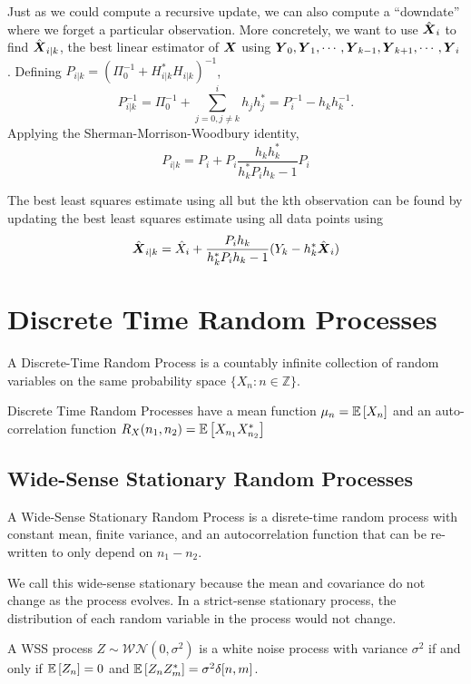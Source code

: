 Just as we could compute a recursive update, we can also compute a ``downdate'' where we forget a particular observation.
More concretely, we want to use $\hat{\boldsymbol{X}}_i$ to find $\hat{\boldsymbol{X}}_{i|k}$, the best linear estimator of $\boldsymbol{X}$ using $\boldsymbol{Y}_0,\boldsymbol{Y}_1,\cdots,\boldsymbol{Y}_{k-1},\boldsymbol{Y}_{k+1},\cdots,\boldsymbol{Y}_i$.
Defining $P_{i|k} = (\Pi_0^{-1} + H_{i|k}^*H_{i|k})^{-1}$,
\[
	P_{i|k}^{-1} = \Pi_0^{-1} + \sum_{j=0,j\neq k}^i h_jh_j^* = P_i^{-1} - h_kh_k^{-1}.
\]
Applying the Sherman-Morrison-Woodbury identity,
\[
	P_{i|k} = P_i + P_i \frac{h_kh_k^*}{h_k^*P_ih_k - 1}P_i
\]
\begin{theorem}
	The best least squares estimate using all but the kth observation can be found by updating the best least squares estimate using all data points using
	\[
		\hat{\boldsymbol{X}}_{i|k} = \hat{X}_i + \frac{P_ih_k}{h_k^*P_ih_k - 1}(Y_k - h_k^*\hat{\boldsymbol{X}}_i)
	\]
	\label{thm:rls:downdate}
\end{theorem}
\section{Discrete Time Random Processes}
\begin{definition}
	A Discrete-Time Random Process is a countably infinite collection of random variables on the same probability space $\{X_n: n\in\mathbb{Z}\}$.
	\label{defn:discrete-time-rp}
\end{definition}
Discrete Time Random Processes have a mean function $\mu_n = \mathbb{E}\left[X_n\right]$ and an auto-correlation function $R_X(n_1, n_2) = \mathbb{E}\left[X_{n_1}X_{n_2}^*\right]$
\subsection{Wide-Sense Stationary Random Processes}
\begin{definition}
	A Wide-Sense Stationary Random Process is a disrete-time random process with constant mean, finite variance, and an autocorrelation function that can be re-written to only depend on $n_1-n_2$.
	\label{defn:wss-process}
\end{definition}
We call this wide-sense stationary because the mean and covariance do not change as the process evolves.
In a strict-sense stationary process, the distribution of each random variable in the process would not change.
\begin{definition}
	A WSS process $Z\sim \mathcal{WN}(0, \sigma^2)$ is a white noise process with variance $\sigma^2$ if and only if $\mathbb{E}\left[Z_n\right] = 0$ and $\mathbb{E}\left[Z_nZ_m^*\right] = \sigma^2\delta[n, m]$.
	\label{defn:white-noise-process}
\end{definition}
